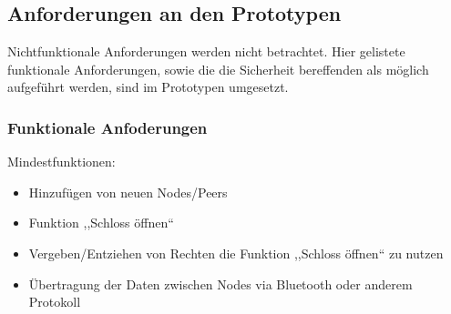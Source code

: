 \subsection{Anforderungen an den Prototypen}
\label{sec:prototype_requirements}
    Nichtfunktionale Anforderungen werden nicht betrachtet.
    Hier gelistete funktionale Anforderungen, sowie die die Sicherheit bereffenden als möglich aufgeführt werden, sind im Prototypen umgesetzt.
    
\subsubsection{Funktionale Anfoderungen}
\label{sec:prototype_func_req}
    Mindestfunktionen:
    \begin{itemize}[noitemsep]
        \item Hinzufügen von neuen Nodes/Peers
        \item Funktion ,,Schloss öffnen``
        \item Vergeben/Entziehen von Rechten die Funktion ,,Schloss öffnen`` zu nutzen
        \item Übertragung der Daten zwischen Nodes via Bluetooth oder anderem Protokoll
    \end{itemize}

